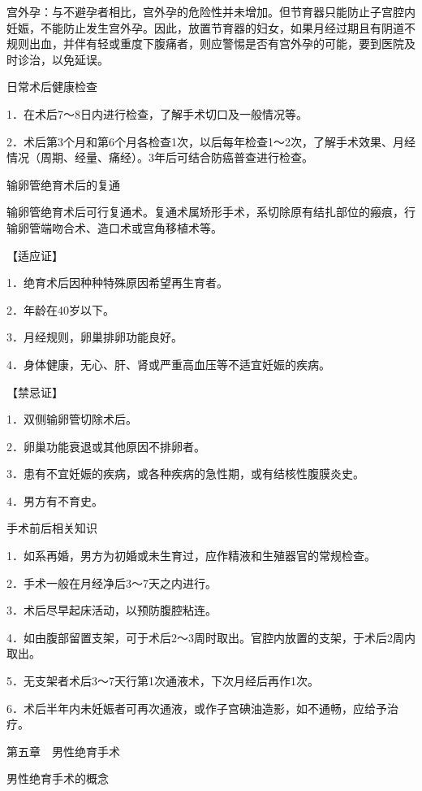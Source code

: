 \documentclass[12pt,UTF8]{ctexbook}
\begin{document}
宫外孕：与不避孕者相比，宫外孕的危险性并未增加。但节育器只能防止子宫腔内妊娠，不能防止发生宫外孕。因此，放置节育器的妇女，如果月经过期且有阴道不规则出血，并伴有轻或重度下腹痛者，则应警惕是否有宫外孕的可能，要到医院及时诊治，以免延误。





日常术后健康检查


1．在术后7～8日内进行检查，了解手术切口及一般情况等。

2．术后第3个月和第6个月各检查1次，以后每年检查1～2次，了解手术效果、月经情况（周期、经量、痛经）。3年后可结合防癌普查进行检查。





输卵管绝育术后的复通


输卵管绝育术后可行复通术。复通术属矫形手术，系切除原有结扎部位的瘢痕，行输卵管端吻合术、造口术或宫角移植术等。

【适应证】

1．绝育术后因种种特殊原因希望再生育者。

2．年龄在40岁以下。

3．月经规则，卵巢排卵功能良好。

4．身体健康，无心、肝、肾或严重高血压等不适宜妊娠的疾病。

【禁忌证】

1．双侧输卵管切除术后。

2．卵巢功能衰退或其他原因不排卵者。

3．患有不宜妊娠的疾病，或各种疾病的急性期，或有结核性腹膜炎史。

4．男方有不育史。





手术前后相关知识


1．如系再婚，男方为初婚或未生育过，应作精液和生殖器官的常规检查。

2．手术一般在月经净后3～7天之内进行。

3．术后尽早起床活动，以预防腹腔粘连。

4．如由腹部留置支架，可于术后2～3周时取出。官腔内放置的支架，于术后2周内取出。

5．无支架者术后3～7天行第1次通液术，下次月经后再作1次。

6．术后半年内未妊娠者可再次通液，或作子宫碘油造影，如不通畅，应给予治疗。





第五章　男性绝育手术


男性绝育手术的概念
\end{document}
